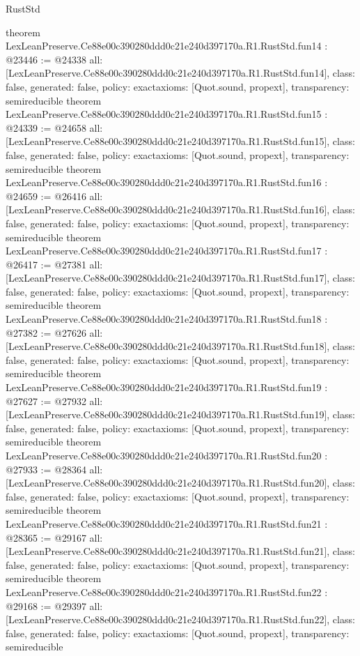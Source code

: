 \begin{lexlean}{RustStd}
\begin{coremodule}
{}
theorem LexLeanPreserve.Ce88e00c390280ddd0c21e240d397170a.R1.RustStd.fun14 : @23446 := @24338 {
  all: [LexLeanPreserve.Ce88e00c390280ddd0c21e240d397170a.R1.RustStd.fun14],
  class: false,
  generated: false,
  policy: exact{axioms: [Quot.sound, propext]},
  transparency: semireducible
}
theorem LexLeanPreserve.Ce88e00c390280ddd0c21e240d397170a.R1.RustStd.fun15 : @24339 := @24658 {
  all: [LexLeanPreserve.Ce88e00c390280ddd0c21e240d397170a.R1.RustStd.fun15],
  class: false,
  generated: false,
  policy: exact{axioms: [Quot.sound, propext]},
  transparency: semireducible
}
theorem LexLeanPreserve.Ce88e00c390280ddd0c21e240d397170a.R1.RustStd.fun16 : @24659 := @26416 {
  all: [LexLeanPreserve.Ce88e00c390280ddd0c21e240d397170a.R1.RustStd.fun16],
  class: false,
  generated: false,
  policy: exact{axioms: [Quot.sound, propext]},
  transparency: semireducible
}
theorem LexLeanPreserve.Ce88e00c390280ddd0c21e240d397170a.R1.RustStd.fun17 : @26417 := @27381 {
  all: [LexLeanPreserve.Ce88e00c390280ddd0c21e240d397170a.R1.RustStd.fun17],
  class: false,
  generated: false,
  policy: exact{axioms: [Quot.sound, propext]},
  transparency: semireducible
}
theorem LexLeanPreserve.Ce88e00c390280ddd0c21e240d397170a.R1.RustStd.fun18 : @27382 := @27626 {
  all: [LexLeanPreserve.Ce88e00c390280ddd0c21e240d397170a.R1.RustStd.fun18],
  class: false,
  generated: false,
  policy: exact{axioms: [Quot.sound, propext]},
  transparency: semireducible
}
theorem LexLeanPreserve.Ce88e00c390280ddd0c21e240d397170a.R1.RustStd.fun19 : @27627 := @27932 {
  all: [LexLeanPreserve.Ce88e00c390280ddd0c21e240d397170a.R1.RustStd.fun19],
  class: false,
  generated: false,
  policy: exact{axioms: [Quot.sound, propext]},
  transparency: semireducible
}
theorem LexLeanPreserve.Ce88e00c390280ddd0c21e240d397170a.R1.RustStd.fun20 : @27933 := @28364 {
  all: [LexLeanPreserve.Ce88e00c390280ddd0c21e240d397170a.R1.RustStd.fun20],
  class: false,
  generated: false,
  policy: exact{axioms: [Quot.sound, propext]},
  transparency: semireducible
}
theorem LexLeanPreserve.Ce88e00c390280ddd0c21e240d397170a.R1.RustStd.fun21 : @28365 := @29167 {
  all: [LexLeanPreserve.Ce88e00c390280ddd0c21e240d397170a.R1.RustStd.fun21],
  class: false,
  generated: false,
  policy: exact{axioms: [Quot.sound, propext]},
  transparency: semireducible
}
theorem LexLeanPreserve.Ce88e00c390280ddd0c21e240d397170a.R1.RustStd.fun22 : @29168 := @29397 {
  all: [LexLeanPreserve.Ce88e00c390280ddd0c21e240d397170a.R1.RustStd.fun22],
  class: false,
  generated: false,
  policy: exact{axioms: [Quot.sound, propext]},
  transparency: semireducible
}
\end{coremodule}
\end{lexlean}
